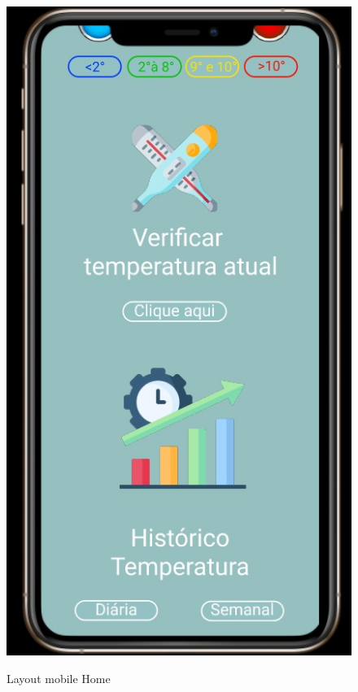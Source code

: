 \documentclass[hidelinks, 12pt, a4paper, brazil, oneside]{abntex2}
\begin{document}
    \begin{figure}[ht]
        \caption{Layout mobile Home}
        \centering
        \includegraphics[scale=0.5]{img/mobile/home.jpeg}
        \label{fig:mobileHome}
    \end{figure}
\end{document}
